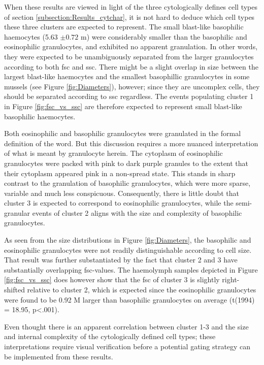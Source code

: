 When these results are viewed in light of the three cytologically defines cell types of section \ref{subsection:Results_cytchar}, it is not hard to deduce which cell types these three clusters are expected to represent. The small blast-like basophilic haemocytes (5.63 $\pm{0.72}$ \micro m) were considerably smaller than the basophilic and eosinophilic granulocytes, and exhibited no apparent granulation. In other words, they were expected to be unambiguously separated from the larger granulocytes according to both \acrshort{fsc} and \acrshort{ssc}. There might be a slight overlap in size between the largest blast-like haemocytes and the smallest basophillic granulocytes in some mussels (see Figure \ref{fig:Diameters}), however; since they are uncomplex cells, they should be separated according to \acrshort{ssc} regardless. The events populating cluster 1 in Figure \ref{fig:fsc_vs_ssc} are therefore expected to represent small blast-like basophilic haemocytes. 

Both eosinophilic and basophilic granulocytes were granulated in the formal definition of the word. But this discussion requires a more nuanced interpretation of what is meant by granulocyte herein. The cytoplasm of eosinophilic granulocytes were packed with pink to dark purple granules to the extent that their cytoplasm appeared pink in a non-spread state. This stands in sharp contrast to the granulation of basophilic granulocytes, which were more sparse, variable and much less conspicuous. Consequently, there is little doubt that cluster 3 is expected to correspond to eosinophilic granulocytes, while the semi-granular events of cluster 2 aligns with the size and complexity of basophilic granulocytes.

As seen from the size distributions in Figure \ref{fig:Diameters}, the basophilic and eosinophilic granulocytes were not readily distinguishable according to cell size. That result was further substantiated by the fact that cluster 2 and 3 have substantially overlapping \acrshort{fsc}-values. The haemolymph samples depicted in Figure \ref{fig:fsc_vs_ssc} does however show that the \acrshort{fsc} of cluster 3 is slightly right-shifted relative to cluster 2, which is expected since the eosinophilic granulocytes were found to be 0.92 \micro M larger than basophilic granulocytes on average (t(1994) = 18.95, p<.001).

Even thought there is an apparent correlation between cluster 1-3 and the size and internal complexity of the cytologically defined cell types; these interpretations require visual verification before a potential gating strategy can be implemented from these results.

